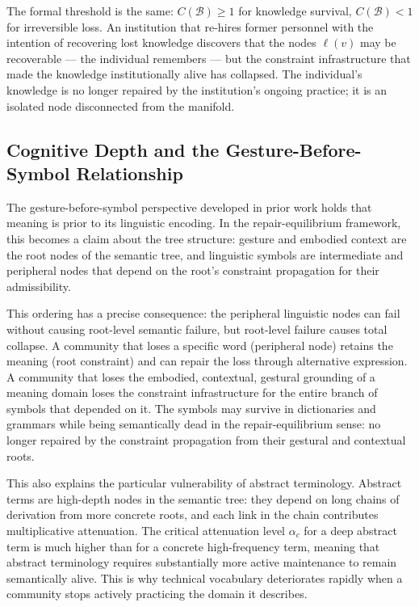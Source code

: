 \documentclass[11pt, a4paper]{article}
\theoremstyle{definition}
\theoremstyle{remark}
\begin{document}
The formal threshold is the same: $C(\mathcal{B}) \geq 1$ for knowledge
survival, $C(\mathcal{B}) < 1$ for irreversible loss. An institution that
re-hires former personnel with the intention of recovering lost knowledge
discovers that the nodes $\ell(v)$ may be recoverable --- the individual
remembers --- but the constraint infrastructure that made the knowledge
institutionally alive has collapsed. The individual's knowledge is no longer
repaired by the institution's ongoing practice; it is an isolated node
disconnected from the manifold.

\subsection{Cognitive Depth and the Gesture-Before-Symbol Relationship}

The gesture-before-symbol perspective developed in prior work holds that meaning
is prior to its linguistic encoding. In the repair-equilibrium framework, this
becomes a claim about the tree structure: gesture and embodied context are the
root nodes of the semantic tree, and linguistic symbols are intermediate and
peripheral nodes that depend on the root's constraint propagation for their
admissibility.

This ordering has a precise consequence: the peripheral linguistic nodes can
fail without causing root-level semantic failure, but root-level failure
causes total collapse. A community that loses a specific word (peripheral
node) retains the meaning (root constraint) and can repair the loss through
alternative expression. A community that loses the embodied, contextual,
gestural grounding of a meaning domain loses the constraint infrastructure for
the entire branch of symbols that depended on it. The symbols may survive in
dictionaries and grammars while being semantically dead in the repair-equilibrium
sense: no longer repaired by the constraint propagation from their gestural and
contextual roots.

This also explains the particular vulnerability of abstract terminology. Abstract
terms are high-depth nodes in the semantic tree: they depend on long chains of
derivation from more concrete roots, and each link in the chain contributes
multiplicative attenuation. The critical attenuation level $\alpha_c$ for a
deep abstract term is much higher than for a concrete high-frequency term,
meaning that abstract terminology requires substantially more active maintenance
to remain semantically alive. This is why technical vocabulary deteriorates
rapidly when a community stops actively practicing the domain it describes.
\end{document}
